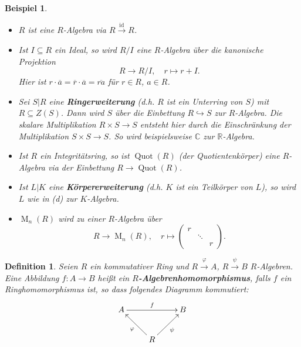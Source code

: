 \documentclass[a4paper, twoside, 11pt, ngerman]{report}
\newcommand{\CC}{\mathds C}
\newcommand{\RR}{\mathds R}
\DeclareMathOperator{\Mat}{M}
\DeclareMathOperator{\Quot}{Quot}
\theoremstyle{definistyle}
\newtheorem{defini}[satz]{Definition}
\newtheorem{bsp}[satz]{Beispiel}
\theoremstyle{remark}
\newcommand{\defn}[1]{\textit{\bfseries #1}}
\begin{document}
\begin{bsp}\label{bsp:6.3}
\begin{itemize}
    \item[(a)] $ R $ ist eine $ R $-Algebra via $ R \xrightarrow{\operatorname{id}} R $.
    \item[(b)] Ist $ I \subseteq R $ ein Ideal, so wird $ R / I $ eine $ R $-Algebra über die kanonische Projektion
    \[
    R \to R / I, \quad r \mapsto r + I.
    \]
    Hier ist $r\cdot\overline{a}=\overline{r}\cdot\overline{a}=\overline{ra}$
    für $r\in R$, $a\in R$.
    \item[(c)] Sei $S|R$ eine \defn{Ringerweiterung} (d.h. $R$ ist ein Unterring von $S$) mit $R \subseteq Z(S)$. Dann wird $S$ über die Einbettung $R\hookrightarrow S$ zur $R$-Algebra. Die skalare Multiplikation $R\times S\to S$ entsteht hier durch die Einschränkung der Multiplikation $S\times S\to S$. So wird beispielsweise $\CC$ zur $\RR$-Algebra.    
    \item[(d)] Ist $R$ ein Integritätsring, so ist $\Quot(R)$ (der Quotientenkörper) eine $R$-Algebra via der Einbettung $R \to \Quot(R)$.
    \item[(e)] Ist $L|K$ eine \defn{Körpererweiterung} (d.h. $K$ ist ein Teilkörper von $L$), so wird $L$ wie in (d) zur $K$-Algebra.
    \item[(f)] $\Mat_n(R)$ wird zu einer $R$-Algebra über
    \[
    R\to\Mat_n(R), \quad r \mapsto 
    \begin{pmatrix}
r &  &  \\
&  \ddots & \\
 &  &   r
\end{pmatrix}.
    \]
\end{itemize}
\end{bsp}

\begin{defini}\label{def:R-Algebrenhomomorphismus}
Seien $R$ ein kommutativer Ring und $R\xrightarrow{\varphi}A$, $R\xrightarrow{\psi}B$ $R$-Algebren. Eine Abbildung $f\colon A\to B$ heißt ein \defn{$R$-Alge\-bren\-homo\-mor\-phis\-mus}, falls $f$ ein Ringhomomorphismus ist, so dass folgendes Diagramm kommutiert:
\[
\begin{xy}
\xymatrix{
A \ar[rr]^{f}  & & B  \\
& \ar[ul]^{\varphi} R \ar[ur]_{\psi} &
}
\end{xy}
\]
\end{defini}
\end{document}
